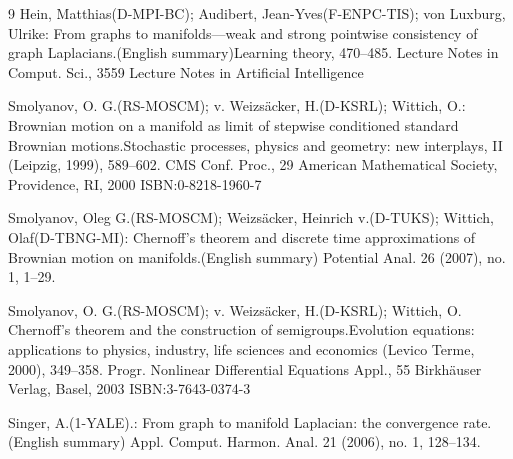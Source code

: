 \documentclass{amsart}
\theoremstyle{Theorem}
\theoremstyle{remark}
\numberwithin{equation}{section} \numberwithin{figure}{section}
\begin{document}
\begin{thebibliography}{9}
 Hein, Matthias(D-MPI-BC); Audibert, Jean-Yves(F-ENPC-TIS); von Luxburg, Ulrike: From graphs to manifolds—weak and strong pointwise consistency of graph Laplacians.(English summary)Learning theory, 470–485.
Lecture Notes in Comput. Sci., 3559 Lecture Notes in Artificial Intelligence



 Smolyanov, O. G.(RS-MOSCM); v. Weizsäcker, H.(D-KSRL); Wittich, O.: Brownian motion on a manifold as limit of stepwise conditioned standard Brownian motions.Stochastic processes, physics and geometry: new interplays, II (Leipzig, 1999), 589–602. CMS Conf. Proc., 29 American Mathematical Society, Providence, RI, 2000
ISBN:0-8218-1960-7

 Smolyanov, Oleg G.(RS-MOSCM); Weizsäcker, Heinrich v.(D-TUKS); Wittich, Olaf(D-TBNG-MI): Chernoff's theorem and discrete time approximations of Brownian motion on manifolds.(English summary) Potential Anal. 26 (2007), no. 1, 1–29.

 Smolyanov, O. G.(RS-MOSCM); v. Weizsäcker, H.(D-KSRL); Wittich, O.
Chernoff's theorem and the construction of semigroups.Evolution equations: applications to physics, industry, life sciences and economics (Levico Terme, 2000), 349–358.
Progr. Nonlinear Differential Equations Appl., 55
Birkhäuser Verlag, Basel, 2003
ISBN:3-7643-0374-3


 Singer, A.(1-YALE).: From graph to manifold Laplacian: the convergence rate.(English summary)
Appl. Comput. Harmon. Anal. 21 (2006), no. 1, 128–134.

\end{thebibliography}
\end{document}

